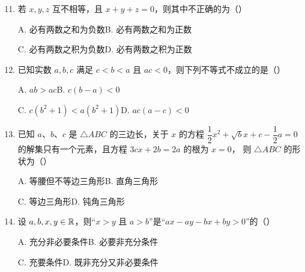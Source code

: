 \documentclass[a4paper,11pt]{article}
\begin{document}
\begin{enumerate}
\setcounter{enumi}{10}

\item 若 $x,y,z$ 互不相等，且 $x+y+z=0$，则其中不正确的为\mbox{（\quad）}

\keepwithprev
A. 必有两数之和为负数\qquad B. 必有两数之和为正数

C. 必有两数之积为负数\qquad D. 必有两数之积为正数


\item 已知实数 $a,b,c$ 满足 $c<b<a$ 且 $ac<0$，则下列不等式不成立的是\mbox{（\quad）}

\keepwithprev
A. $ab>ac$\qquad B. $c(b-a)<0$

C. $c(b^2+1)<a(b^2+1)$\qquad D. $ac(a-c)<0$


\item 已知 $a$、$b$、$c$ 是 $\triangle ABC$ 的三边长，关于 $x$ 的方程
$\dfrac12x^2+\sqrt{b}x+c-\dfrac12a=0$ 的解集只有一个元素，且方程 $3cx+2b=2a$ 的根为 $x=0$，
则 $\triangle ABC$ 的形状为\mbox{（\quad）}

\keepwithprev
A. 等腰但不等边三角形\qquad B. 直角三角形

C. 等边三角形\qquad D. 钝角三角形


\ifanswer
\solbegin
{}
\solend

\fi

\item 设 $a,b,x,y\in\mathbb{R}$，则“$x>y$ 且 $a>b$”是“$ax-ay-bx+by>0$”的\mbox{（\quad）}

\keepwithprev
A. 充分非必要条件\qquad B. 必要非充分条件

C. 充要条件\qquad D. 既非充分又非必要条件


\end{enumerate}

\end{document}
